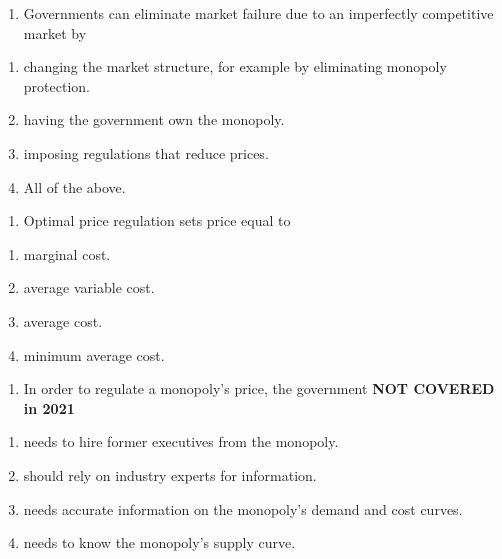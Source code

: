 \documentclass[11pt,]{article}
\providecommand{\tightlist}{%
  \setlength{\itemsep}{0pt}\setlength{\parskip}{0pt}}
\begin{document}
\begin{enumerate}
\def\labelenumi{\arabic{enumi})}
\setcounter{enumi}{8}
\tightlist
\item
  Governments can eliminate market failure due to an imperfectly
  competitive market by
\end{enumerate}

\begin{enumerate}
\def\labelenumi{\Alph{enumi})}
\tightlist
\item
  changing the market structure, for example by eliminating monopoly
  protection.
\item
  having the government own the monopoly.
\item
  imposing regulations that reduce prices.
\item
  All of the above.
\end{enumerate}

\begin{enumerate}
\def\labelenumi{\arabic{enumi})}
\setcounter{enumi}{9}
\tightlist
\item
  Optimal price regulation sets price equal to
\end{enumerate}

\begin{enumerate}
\def\labelenumi{\Alph{enumi})}
\tightlist
\item
  marginal cost.
\item
  average variable cost.
\item
  average cost.
\item
  minimum average cost.
\end{enumerate}

\begin{enumerate}
\def\labelenumi{\arabic{enumi})}
\setcounter{enumi}{10}
\tightlist
\item
  In order to regulate a monopoly's price, the government \textbf{NOT COVERED in 2021}
\end{enumerate}

\begin{enumerate}
\def\labelenumi{\Alph{enumi})}
\tightlist
\item
  needs to hire former executives from the monopoly.
\item
  should rely on industry experts for information.
\item
  needs accurate information on the monopoly's demand and cost curves.
\item
  needs to know the monopoly's supply curve.
\end{enumerate}
\end{document}
